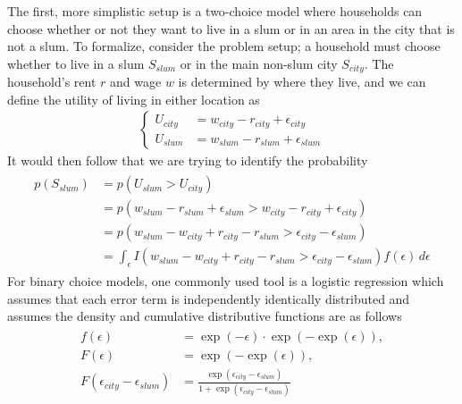 The first, more simplistic setup is a two-choice model where households can choose whether or not they want to live in a slum or in an area in the city that is not a slum. To formalize, consider the problem setup; a household must choose whether to live in a slum $S_{slum}$ or in the main non-slum city $S_{city}$. The household's rent $r$ and wage $w$ is determined by where they live, and we can define the utility of living in either location as \begin{align}\begin{cases}
    U_{city} &= w_{city} - r_{city} + \epsilon_{city}\\
    U_{slum} &= w_{slum} - r_{slum} + \epsilon_{slum}
    \end{cases}\end{align}
    It would then follow that we are trying to identify the probability \begin{align}\begin{split}
        p(S_{slum}) &= p(U_{slum} > U_{city})\\
                    &= p(w_{slum} - r_{slum} + \epsilon_{slum} > w_{city} - r_{city} + \epsilon_{city})\\
                    &= p(w_{slum} - w_{city} + r_{city} - r_{slum} > \epsilon_{city} - \epsilon_{slum})\\
                    &= \int_{\epsilon}I(w_{slum} - w_{city} + r_{city} - r_{slum} > \epsilon_{city} - \epsilon_{slum}) f(\epsilon)\,d\epsilon
    \end{split}\end{align} 
    For binary choice models, one commonly used tool is a logistic regression which assumes that each error term is independently identically distributed and assumes the density and cumulative distributive functions are as follows \begin{align}
        \begin{split}
        f(\epsilon) &= \exp(-\epsilon)\cdot \exp(-\exp(\epsilon)),\\
        F(\epsilon) &= \exp(-\exp(\epsilon)),\\
        F(\epsilon_{city} - \epsilon_{slum}) &= \frac{\exp(\epsilon_{city} - \epsilon_{slum})}{1 + \exp(\epsilon_{city} - \epsilon_{slum})}
        \end{split}
    \end{align} 
